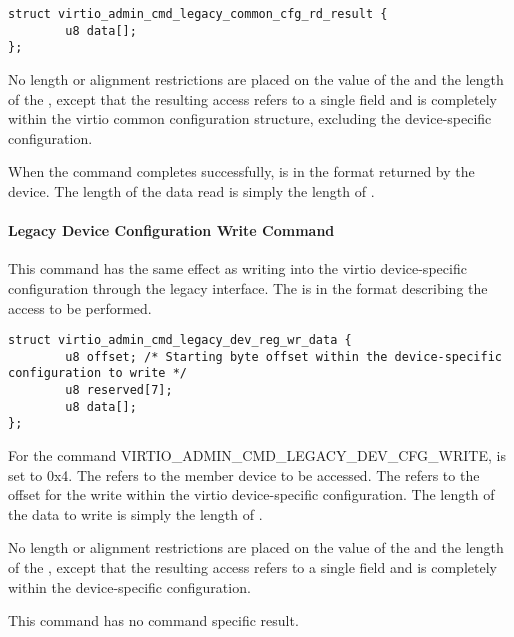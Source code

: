 \begin{lstlisting}
struct virtio_admin_cmd_legacy_common_cfg_rd_result {
        u8 data[];
};
\end{lstlisting}

No length or alignment restrictions are placed on the value of the
 and the length of the , except that the resulting
access refers to a single field and is completely within the virtio common
configuration structure, excluding the device-specific configuration.

When the command completes successfully, 
is in the format 
returned by the device. The length of the data read is simply the length of
.

\paragraph{Legacy Device Configuration Write Command}\label{par:Basic Facilities of a Virtio Device / Device groups / Group administration commands / Legacy Interface / Legacy Device Configuration Write Command}

This command has the same effect as writing into the virtio device-specific
configuration through the legacy interface. The  is in
the format  describing
the access to be performed.

\begin{lstlisting}
struct virtio_admin_cmd_legacy_dev_reg_wr_data {
        u8 offset; /* Starting byte offset within the device-specific configuration to write */
        u8 reserved[7];
        u8 data[];
};
\end{lstlisting}

For the command VIRTIO_ADMIN_CMD_LEGACY_DEV_CFG_WRITE, 
is set to 0x4.
The  refers to the member device to be accessed.
The  refers to the offset for the write within the virtio
device-specific configuration. The length of the data to write is simply
the length of .

No length or alignment restrictions are placed on the value of the
 and the length of the , except that the resulting
access refers to a single field and is completely within the device-specific
configuration.

This command has no command specific result.


